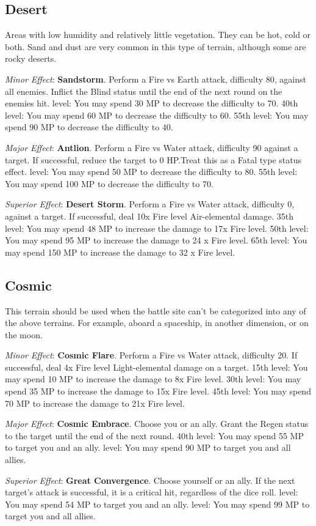 \begin{multicols}{2}
\subsection*{Desert}\label{subsec:geo-desert}
Areas with low humidity and relatively little vegetation. They can be hot, cold or both. Sand and dust are very common in this type of terrain, although some are rocky deserts.

\textit{Minor Effect}: \textbf{Sandstorm}. Perform a Fire vs Earth attack, difficulty 80, against all enemies. Inflict the Blind status until the end of the next round on the enemies hit. level: You may spend 30 MP to decrease the difficulty to 70. 40th level: You may spend 60 MP to decrease the difficulty to 60. 55th level: You may spend 90 MP to decrease the difficulty to 40.

\textit{Major Effect}: \textbf{Antlion}. Perform a Fire vs Water attack, difficulty 90 against a target. If successful, reduce the target to 0 HP.\@{}Treat this as a Fatal type status effect.  level: You may spend 50 MP to decrease the difficulty to 80. 55th level: You may spend 100 MP to decrease the difficulty to 70.

\textit{Superior Effect}: \textbf{Desert Storm}. Perform a Fire vs Water attack, difficulty 0, against a target. If successful, deal 10x Fire level Air-elemental damage. 35th level: You may spend 48 MP to increase the damage to 17x Fire level. 50th level: You may spend 95 MP to increase the damage to 24 x Fire level. 65th level: You may spend 150 MP to increase the damage to 32 x Fire level.

\subsection*{Cosmic}\label{subsec:geo-cosmic}
This terrain should be used when the battle site can’t be categorized into any of the above terrains. For example, aboard a spaceship, in another dimension, or on the moon.

\textit{Minor Effect}: \textbf{Cosmic Flare}. Perform a Fire vs Water attack, difficulty 20. If successful, deal 4x Fire level Light-elemental damage on a target. 15th level: You may spend 10 MP to increase the damage to 8x Fire level. 30th level: You may spend 35 MP to increase the damage to 15x Fire level. 45th level: You may spend 70 MP to increase the damage to 21x Fire level.

\textit{Major Effect}: \textbf{Cosmic Embrace}. Choose you or an ally. Grant the Regen status to the target until the end of the next round. 40th level: You may spend 55 MP to target you and an ally.  level: You may spend 90 MP to target you and all allies.

\textit{Superior Effect}: \textbf{Great Convergence}. Choose yourself or an ally. If the next target’s attack is successful, it is a critical hit, regardless of the dice roll.  level: You may spend 54 MP to target you and an ally.  level: You may spend 99 MP to target you and all allies.

\end{multicols}
 
